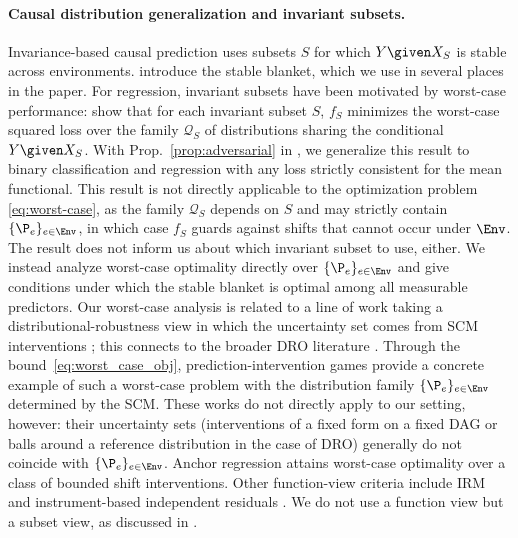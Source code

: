 \paragraph{Causal distribution generalization and invariant subsets.}
Invariance-based causal prediction \citep{petersCausalInferenceUsing2015, magliacaneDomainAdaptation2018, christiansenCausalFrameworkDistribution2021} uses subsets $S$ for which $Y \given X_S$ is stable across environments. \citet{pfisterStabilizingVariableSelection2021} introduce the stable blanket, 
which we use in several places in the paper.
For regression, invariant subsets have been motivated by worst-case performance: \citet{rojas-carullaInvariantModelsCausal2018} show that for each invariant subset $S$, $f_S$ minimizes the worst-case squared loss over the family $\mathcal{Q}_S$ of distributions sharing the conditional $Y \given X_S$. With Prop.~\ref{prop:adversarial} 
in , we generalize this result to binary classification and regression with any loss strictly consistent for the mean functional. 
This result is not directly applicable to the optimization problem \eqref{eq:worst-case}, as
the family $\mathcal{Q}_S$ depends on $S$ and may strictly contain $\{\P_e\}_{e \in \Env}$, in which case $f_S$ guards against shifts that cannot occur under $\Env$.  The result
does not inform us about which invariant subset to use, either.
We instead analyze worst-case optimality directly over $\{\P_e\}_{e \in \Env}$ and give conditions under which the stable blanket is optimal among all measurable predictors.
Our worst-case analysis is related to a line of work taking a distributional-robustness view in which the uncertainty set comes from SCM interventions \citep{meinshausenCausalityDistributional2018, buhlmannInvarianceCausalityRobustness2020, subbaswamyUnifyingCausalFramework2022, shenCausalityorientedRobustness2023}; this connects to the broader DRO literature \citep{Kuhn_Shafiee_Wiesemann_2025, sagawa_groupDRO, freni2025maximum}.
Through the bound~\eqref{eq:worst_case_obj}, prediction-intervention games provide a concrete example of such a worst-case problem with the distribution family $\{\P_e\}_{e \in \Env}$ determined by the SCM. These works do not directly apply to our setting, however: their uncertainty sets (interventions of a fixed form on a fixed DAG or balls around a reference distribution in the case of DRO) generally do not coincide with $\{\P_e\}_{e \in \Env}$. Anchor regression \citep{rothenhauslerAnchorRegressionHeterogeneous2020} attains worst-case optimality over a class of bounded shift interventions. Other function-view criteria include IRM \citep{arjovskyInvariantRiskMinimization2020} and instrument-based independent residuals \citep{saengkyongamExploitingIndependentInstruments2022}. We do not use a function view but a subset view, as discussed in .
